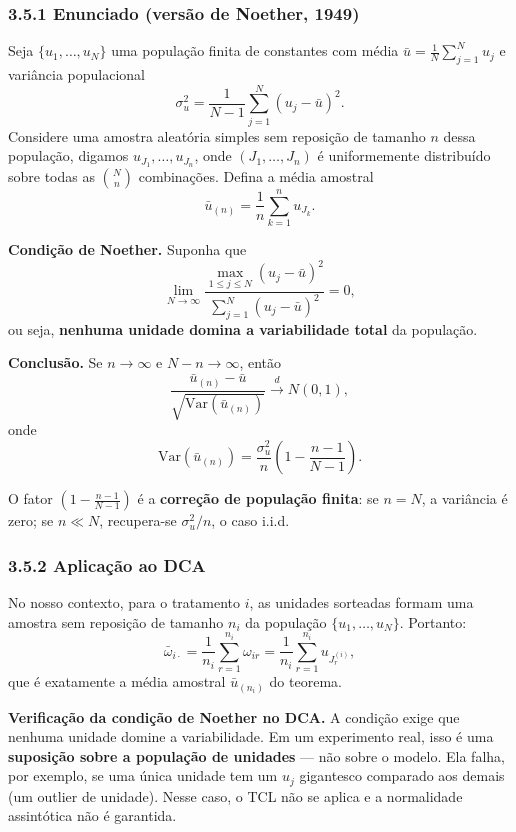 \documentclass[
]{article}
\begin{document}
\subsubsection{3.5.1 Enunciado (versão de Noether,
1949)}\label{enunciado-versuxe3o-de-noether-1949}

Seja \(\{u_1,\dots,u_N\}\) uma população finita de constantes com média
\(\bar u = \frac{1}{N}\sum_{j=1}^{N} u_j\) e variância populacional
\[\sigma_u^2 = \frac{1}{N-1}\sum_{j=1}^{N} (u_j - \bar u)^2.\] Considere
uma amostra aleatória simples sem reposição de tamanho \(n\) dessa
população, digamos \(u_{J_1},\dots,u_{J_n}\), onde \((J_1,\dots,J_n)\) é
uniformemente distribuído sobre todas as \(\binom{N}{n}\) combinações.
Defina a média amostral
\[\bar u_{(n)} = \frac{1}{n}\sum_{k=1}^{n} u_{J_k}.\]

\textbf{Condição de Noether.} Suponha que
\[\lim_{N \to \infty} \frac{\max_{1 \leq j \leq N} (u_j - \bar u)^2}{\sum_{j=1}^{N} (u_j - \bar u)^2} = 0,\]
ou seja, \textbf{nenhuma unidade domina a variabilidade total} da
população.

\textbf{Conclusão.} Se \(n \to \infty\) e \(N - n \to \infty\), então
\[\frac{\bar u_{(n)} - \bar u}{\sqrt{\mathrm{Var}(\bar u_{(n)})}} \xrightarrow{d} N(0,1),\]
onde
\[\mathrm{Var}(\bar u_{(n)}) = \frac{\sigma_u^2}{n}\left(1 - \frac{n-1}{N-1}\right).\]

O fator \((1 - \frac{n-1}{N-1})\) é a \textbf{correção de população
finita}: se \(n = N\), a variância é zero; se \(n \ll N\), recupera-se
\(\sigma_u^2/n\), o caso i.i.d.

\subsubsection{3.5.2 Aplicação ao DCA}\label{aplicauxe7uxe3o-ao-dca}

No nosso contexto, para o tratamento \(i\), as unidades sorteadas formam
uma amostra sem reposição de tamanho \(n_i\) da população
\(\{u_1,\dots,u_N\}\). Portanto:
\[\bar \omega_{i\cdot} = \frac{1}{n_i}\sum_{r=1}^{n_i} \omega_{ir} = \frac{1}{n_i}\sum_{r=1}^{n_i} u_{J_r^{(i)}},\]
que é exatamente a média amostral \(\bar u_{(n_i)}\) do teorema.

\textbf{Verificação da condição de Noether no DCA.} A condição exige que
nenhuma unidade domine a variabilidade. Em um experimento real, isso é
uma \textbf{suposição sobre a população de unidades} --- não sobre o
modelo. Ela falha, por exemplo, se uma única unidade tem um \(u_j\)
gigantesco comparado aos demais (um outlier de unidade). Nesse caso, o
TCL não se aplica e a normalidade assintótica não é garantida.
\end{document}
